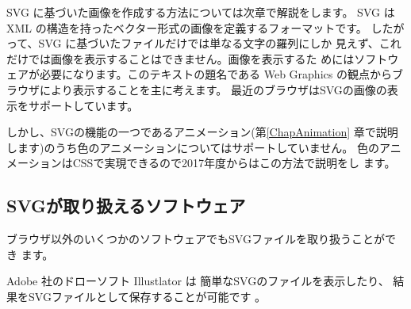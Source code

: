 SVG に基づいた画像を作成する方法については次章で解説をします。
%
SVG は XML の構造を持ったベクター形式の画像を定義するフォーマットです。
したがって、SVG に基づいたファイルだけでは単なる文字の羅列にしか
見えず、これだけでは画像を表示することはできません。画像を表示するた
めにはソフトウェアが必要になります。このテキストの題名である Web
Graphics の観点からブラウザにより表示することを主に考えます。
最近のブラウザはSVGの画像の表示をサポートしています。

しかし、SVGの機能の一つであるアニメーション(第\ref{ChapAnimation}
章で説明します)のうち色のアニメーションについてはサポートしていません。
色のアニメーションはCSSで実現できるので2017年度からはこの方法で説明をし
ます。

\subsection{SVGが取り扱えるソフトウェア}
ブラウザ以外のいくつかのソフトウェアでもSVGファイルを取り扱うことができ
ます。

Adobe 社のドローソフト Illustlator は 簡単なSVGのファイルを表示したり、
結果をSVGファイルとして保存することが可能です
。

